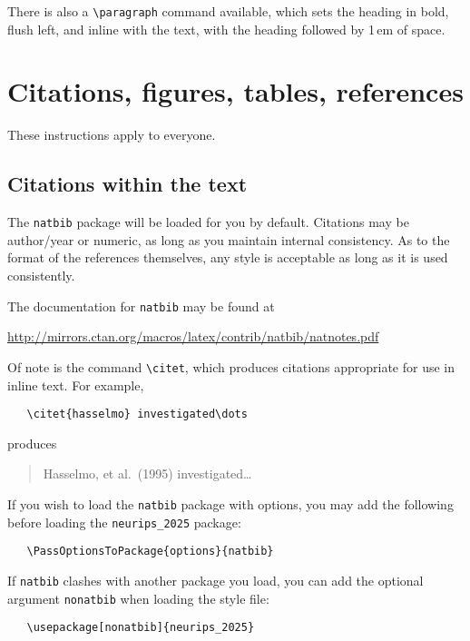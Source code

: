 \documentclass{article}
\begin{document}
There is also a \verb+\paragraph+ command available, which sets the heading in
bold, flush left, and inline with the text, with the heading followed by 1\,em
of space.


\section{Citations, figures, tables, references}
\label{others}


These instructions apply to everyone.


\subsection{Citations within the text}


The \verb+natbib+ package will be loaded for you by default.  Citations may be
author/year or numeric, as long as you maintain internal consistency.  As to the
format of the references themselves, any style is acceptable as long as it is
used consistently.


The documentation for \verb+natbib+ may be found at
\begin{center}
    \url{http://mirrors.ctan.org/macros/latex/contrib/natbib/natnotes.pdf}
\end{center}
Of note is the command \verb+\citet+, which produces citations appropriate for
use in inline text.  For example,
\begin{verbatim}
   \citet{hasselmo} investigated\dots
\end{verbatim}
produces
\begin{quote}
    Hasselmo, et al.\ (1995) investigated\dots
\end{quote}


If you wish to load the \verb+natbib+ package with options, you may add the
following before loading the \verb+neurips_2025+ package:
\begin{verbatim}
   \PassOptionsToPackage{options}{natbib}
\end{verbatim}


If \verb+natbib+ clashes with another package you load, you can add the optional
argument \verb+nonatbib+ when loading the style file:
\begin{verbatim}
   \usepackage[nonatbib]{neurips_2025}
\end{verbatim}
\end{document}

